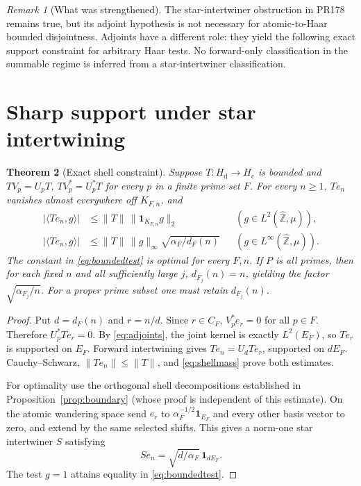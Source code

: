 \documentclass[11pt]{article}
\newtheorem{theorem}{Theorem}
\theoremstyle{remark}
\newtheorem{remark}[theorem]{Remark}
\newcommand{\Zhat}{\widehat{\mathbb Z}}
\newcommand{\Hd}{H_{\mathrm d}}
\newcommand{\Hc}{H_{\mathrm c}}
\newcommand{\one}{\mathbf 1}
\begin{document}
\begin{remark}[What was strengthened]
The star-intertwiner obstruction in PR178 remains true, but its adjoint
hypothesis is not necessary for atomic-to-Haar bounded disjointness.
Adjoints have a different role: they yield the following exact support
constraint for arbitrary Haar tests.  No forward-only classification in
the summable regime is inferred from a star-intertwiner classification.
\end{remark}

\section{Sharp support under star intertwining}

\begin{theorem}[Exact shell constraint]\label{thm:shell}
Suppose $T:\Hd\to\Hc$ is bounded and
$TV_p=U_pT$, $TV_p^*=U_p^*T$ for every $p$ in a finite prime set $F$.
For every $n\geq1$, $Te_n$ vanishes almost everywhere off $K_{F,n}$, and
\begin{align}
 |\langle Te_n,g\rangle|
 &\leq\|T\|\,\|\one_{K_{F,n}}g\|_2
 &&(g\in L^2(\Zhat,\mu)),\label{eq:localtest}\\
 |\langle Te_n,g\rangle|
 &\leq\|T\|\,\|g\|_\infty
       \sqrt{\alpha_F/d_F(n)}
 &&(g\in L^\infty(\Zhat,\mu)).\label{eq:boundedtest}
\end{align}
The constant in \eqref{eq:boundedtest} is optimal for every $F,n$.
If $P$ is all primes, then for each fixed $n$ and all sufficiently large
$j$, $d_{F_j}(n)=n$, yielding the factor $\sqrt{\alpha_{F_j}/n}$.
For a proper prime subset one must retain $d_{F_j}(n)$.
\end{theorem}
\begin{proof}
Put $d=d_F(n)$ and $r=n/d$.  Since $r\in C_F$, $V_p^*e_r=0$
for all $p\in F$.  Therefore $U_p^*Te_r=0$.  By \eqref{eq:adjoints},
the joint kernel is exactly $L^2(E_F)$, so $Te_r$ is supported on $E_F$.
Forward intertwining gives $Te_n=U_dTe_r$, supported on $dE_F$.
Cauchy--Schwarz, $\|Te_n\|\leq\|T\|$, and \eqref{eq:shellmass} prove
both estimates.

For optimality use the orthogonal shell decompositions established in
Proposition~\ref{prop:boundary} (whose proof is independent of this estimate).
On the atomic wandering space send $e_r$ to
$\alpha_F^{-1/2}\one_{E_F}$ and every other basis vector to zero, and
extend by the same selected shifts.  This gives a norm-one star
intertwiner $S$ satisfying
\[
 Se_n=\sqrt{d/\alpha_F}\,\one_{dE_F}.
\]
The test $g=1$ attains equality in \eqref{eq:boundedtest}.
\end{proof}
\end{document}
